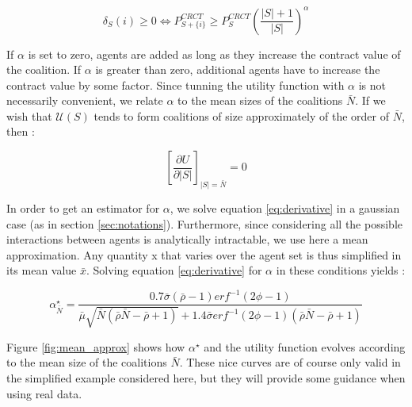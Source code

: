 \documentclass[conference]{IEEEtran}
\begin{document}
\begin{equation}
\delta_{S}(i) \geq 0 \Leftrightarrow P_{S+\{i\}}^{CRCT} \geq P_{S}^{CRCT} \left( \dfrac{|S|+1}{|S|} \right)^{\alpha}
\label{eq:marginal_benefit}
\end{equation}

If $ \alpha $ is set to zero, agents are added as long as they increase the contract value of the coalition. If $ \alpha $ is greater than zero, additional agents have to increase the contract value by some factor. Since tunning the utility function with $ \alpha $ is not necessarily convenient, we relate $ \alpha $ to the mean sizes of the coalitions $ \bar{N} $. If we wish that $ \mathcal{U}(S) $ tends to form coalitions of size approximately of the order of $ \bar{N} $, then :

\begin{equation}
\left[ \dfrac{\partial{ U}}{ \partial{|S|}} \right]_{|S| = \bar{N}} = 0
\label{eq:derivative}
\end{equation}

In order to get an estimator for $ \alpha $, we solve equation \ref{eq:derivative} in a gaussian case (as in section \ref{sec:notations}). Furthermore, since considering all the possible interactions between agents is analytically intractable, we use here a mean approximation. Any quantity x that varies over the agent set is thus simplified in its mean value $ \bar{x} $. Solving equation \ref{eq:derivative} for $ \alpha $ in these conditions yields :

\footnotesize
\begin{equation}
\alpha^{\star}_{\bar{N}} = \dfrac{0.7 \bar{\sigma}(\bar{\rho}-1)erf^{-1}(2 \phi - 1)}{\bar{\mu}\sqrt{\bar{N}(\bar{\rho}\bar{N}-\bar{\rho}+1)}+1.4 \bar{\sigma} erf^{-1} (2 \phi -1 ) (\bar{\rho}\bar{N}-\bar{\rho} + 1)} 
\label{eq:alpha_star}
\end{equation}
\normalsize

Figure \ref{fig:mean_approx} shows how $ \alpha^{\star} $ and the utility function evolves according to the mean size of the coalitions $ \bar{N} $. These nice curves are of course only valid in the simplified example considered here, but they will provide some guidance when using real data.
\end{document}
